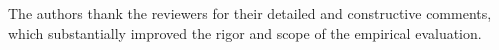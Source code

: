 The authors thank the reviewers for their detailed and constructive comments,
which substantially improved the rigor and scope of the empirical evaluation.
